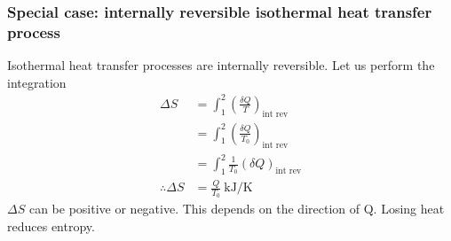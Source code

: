 \documentclass[class=report, crop=false, 12pt,a4paper]{standalone}
\numberwithin{equation}{section}
\begin{document}
\subsubsection{Special case: internally reversible isothermal heat transfer process}
Isothermal heat transfer processes are internally reversible. Let us perform the integration
\begin{align}
  \Delta S &= \int_1^2 \left(\frac{\delta Q}{T}\right)_{\textrm{int rev}}\\
  &= \int_1^2 \left(\frac{\delta Q}{T_0}\right)_{\textrm{int rev}}\\
  &= \int_1^2 \frac{1}{T_0}\left(\delta Q\right)_{\textrm{int rev}}\\
  \therefore \Delta S &= \frac{Q}{T_0} \ \si{\kilo\joule\per\kelvin} \label{clausius4}
\end{align}
\(\Delta S\) can be positive or negative. This depends on the direction of Q. Losing heat reduces entropy.
\end{document}
